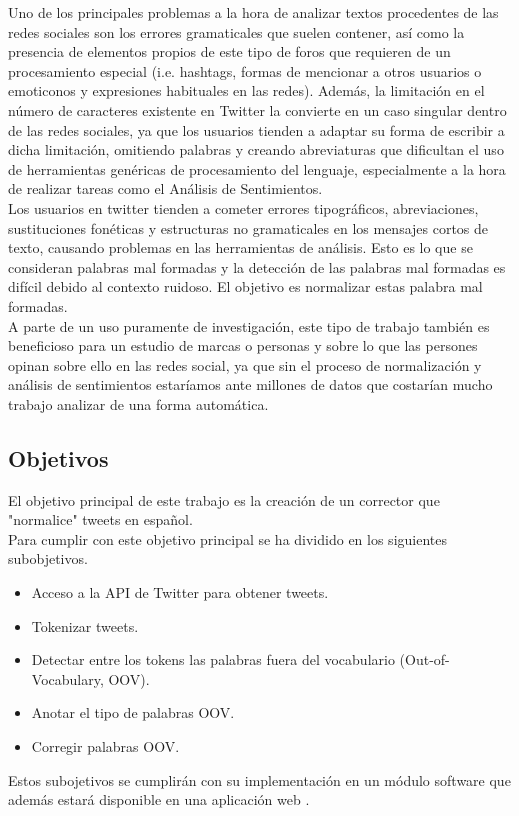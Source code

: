 \documentclass[spanish,12pt, a4paper,twoside]{paper}
\begin{document}
Uno de los principales problemas a la hora de analizar textos procedentes de las redes sociales son los errores gramaticales que suelen contener, así como la presencia de elementos propios de este tipo de foros que requieren de un procesamiento especial (i.e. hashtags, formas de mencionar a otros usuarios o emoticonos y expresiones habituales en las redes). Además, la limitación en el número de caracteres existente en Twitter la convierte en un caso singular dentro de las redes sociales, ya que los usuarios tienden a adaptar su forma de escribir a dicha limitación, omitiendo palabras y creando abreviaturas que dificultan el uso de herramientas genéricas de procesamiento del lenguaje, especialmente a la hora de realizar tareas como el Análisis de Sentimientos.\\

Los usuarios en twitter tienden a cometer errores tipográficos, abreviaciones, sustituciones fonéticas y estructuras no gramaticales en los mensajes cortos de texto, causando problemas en las herramientas de análisis. Esto es lo que se consideran palabras mal formadas y la detección de las palabras mal formadas es difícil debido al contexto ruidoso. El objetivo es normalizar estas palabra mal formadas.\\

A parte de un uso puramente de investigación, este tipo de trabajo también es beneficioso para un estudio de marcas o personas y sobre lo que las persones opinan sobre ello en las redes social, ya que sin el proceso de normalización y análisis de sentimientos estaríamos ante millones de datos que costarían mucho trabajo analizar de una forma automática.

\subsection{Objetivos}\label{sec:objetivos}
El objetivo principal de este trabajo es la creación de un corrector que "normalice" tweets en español.\\Para cumplir con este objetivo principal se ha dividido en los siguientes subobjetivos.
\begin{itemize}
\item Acceso a la API de Twitter para obtener tweets.
\item Tokenizar tweets.
\item Detectar entre los tokens las palabras fuera del vocabulario (Out-of-Vocabulary, OOV).
\item Anotar el tipo de palabras OOV.
\item Corregir palabras OOV. 
\end{itemize}
Estos subojetivos se cumplirán con su implementación en un módulo software que además estará disponible en una aplicación web \cite{tweetscweb}.\\
\end{document}
